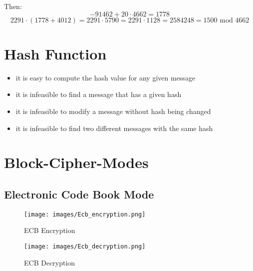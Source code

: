 \documentclass[a4paper]{article}
\begin{document}
Then:
\[ -91462 + 20 \cdot 4662 = 1778 \]
\[2291 \cdot (1778 + 4012) = 2291 \cdot 5790 = 2291 \cdot 1128 = 2584248 = 1500 \text{ mod } 4662\]
%
%
%
%
%
%
%
%
%
\section{Hash Function}
\begin{itemize}
    \item it is easy to compute the hash value for any given message
    \item it is infeasible to find a message that has a given hash
    \item it is infeasible to modify a message without hash being changed
    \item it is infeasible to find two different messages with the same hash
\end{itemize}

\section{Block-Cipher-Modes}

\subsection{Electronic Code Book Mode}

\begin{figure}[!ht]
	\begin{center}
		\texttt{[image: images/Ecb\_encryption.png]}
	\end{center}
	\caption{ECB Encryption}
	\label{fig:ecb_en}
\end{figure}
\begin{figure}[!ht]
	\begin{center}
		\texttt{[image: images/Ecb\_decryption.png]}
	\end{center}
	\caption{ECB Decryption}
	\label{fig:ecb_de}
\end{figure}
\end{document}
